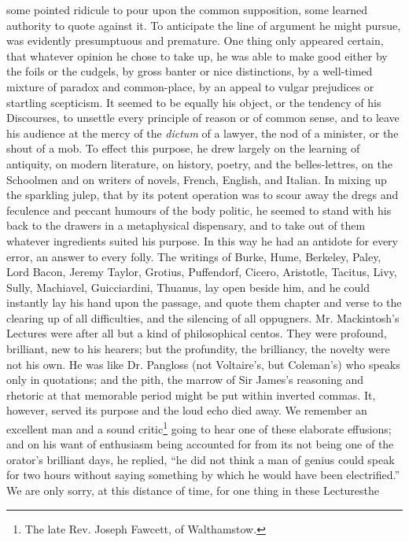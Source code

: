 some pointed ridicule to pour upon the common supposition, some
learned authority to quote against it. To anticipate the line of
argument he might pursue, was evidently presumptuous and
premature. One thing only appeared certain, that whatever opinion
he chose to take up, he was able to make good either by the foils
or the cudgels, by gross banter or nice distinctions, by a
well-timed mixture of paradox and common-place, by an appeal to
vulgar prejudices or startling scepticism.  It seemed to be
equally his object, or the tendency of his Discourses, to unsettle
every principle of reason or of common sense, and to leave his
audience at the mercy of the \emph{dictum} of a lawyer, the nod of
a minister, or the shout of a mob. To effect this purpose, he drew
largely on the learning of antiquity, on modern literature, on
history, poetry, and the belles-lettres, on the Schoolmen and on
writers of novels, French, English, and Italian. In mixing up the
sparkling julep, that by its potent operation was to scour away
the dregs and feculence and peccant humours of the body politic,
he seemed to stand with his back to the drawers in a metaphysical
dispensary, and to take out of them whatever ingredients suited
his purpose. In this way he had an antidote for every error, an
answer to every folly. The writings of Burke, Hume, Berkeley,
Paley, Lord Bacon, Jeremy Taylor, Grotius, Puffendorf, Cicero,
Aristotle, Tacitus, Livy, Sully, Machiavel, Guicciardini, Thuanus,
lay open beside him, and he could instantly lay his hand upon the
passage, and quote them chapter and verse to the clearing up of
all difficulties, and the silencing of all
oppugners. Mr. Mackintosh's Lectures were after all but a kind of
philosophical centos. They were profound, brilliant, new to his
hearers; but the profundity, the brilliancy, the novelty were not
his own. He was like Dr. Pangloss (not Voltaire's, but Coleman's)
who speaks only in quotations; and the pith, the marrow of Sir
James's reasoning and rhetoric at that memorable period might be
put within inverted commas. It, however, served its purpose and
the loud echo died away. We remember an excellent man and a sound
critic\footnote{The late Rev. Joseph Fawcett, of Walthamstow.}
going to hear one of these elaborate effusions; and on his want of
enthusiasm being accounted for from its not being one of the
orator's brilliant days, he replied, ``he did not think a man of
genius could speak for two hours without saying something by which
he would have been electrified.''  We are only sorry, at this
distance of time, for one thing in these Lectures\textemdash the
